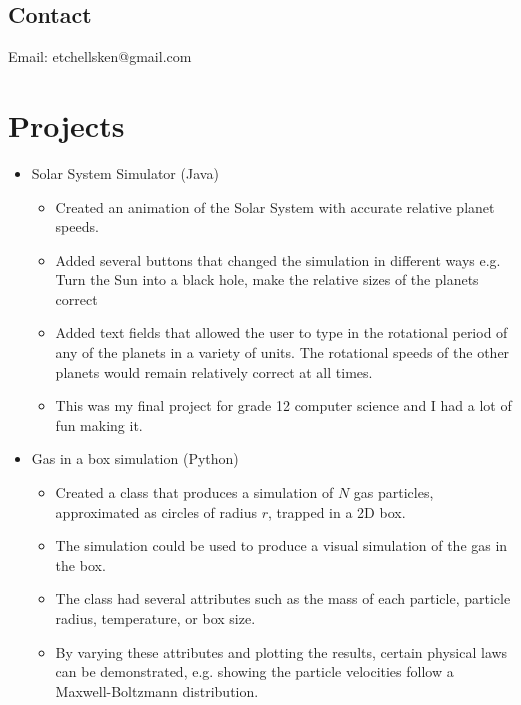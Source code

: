\documentclass[]{cv-style}          %
\begin{document}




\begin{aside}
%
\section{Contact}
Email:
etchellsken@gmail.com
%
\end{aside}

\section{Projects}
\begin{itemize}
    \item Solar System Simulator (Java)
    \begin{itemize}
        \item Created an animation of the Solar System with accurate relative planet speeds.
        \item Added several buttons that changed the simulation in different ways e.g. Turn the Sun into a black hole, make the relative sizes of the planets correct
        \item Added text fields that allowed the user to type in the rotational period of any of the planets in a variety of units. The rotational speeds of the other planets would remain relatively correct at all times.
        \item This was my final project for grade 12 computer science and I had a lot of fun making it.
    \end{itemize}
    
    \item Gas in a box simulation (Python)
    \begin{itemize}
        \item Created a class that produces a simulation of $N$ gas particles, approximated as circles of radius $r$, trapped in a 2D box.
        \item The simulation could be used to produce a visual simulation of the gas in the box.
        \item The class had several attributes such as the mass of each particle, particle radius, temperature, or box size.
        \item By varying these attributes and plotting the results, certain physical laws can be demonstrated, e.g. showing the particle velocities follow a Maxwell-Boltzmann distribution.
    \end{itemize}
    

\end{itemize}
\end{document}
